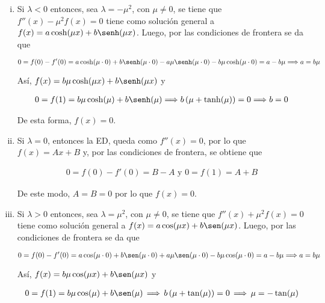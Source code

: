 \documentclass[fleqn]{article}
\begin{document}
\begin{enumerate}[I.]
\begin{enumerate}
			\normalfont

			\begin{enumerate}[i)]
				\item Si $ \lambda < 0 $ entonces, sea $ \lambda = - \mu^2 $, con $ \mu \neq 0 $, se tiene que $ f''(x) - \mu^2 f(x) = 0 $
				tiene como solución general a $ f(x) = a \cosh(\mu x) + b \senh(\mu x) $. Luego, por las condiciones de frontera se da que
				
				\begin{equation*}
					0 = f(0) - f'(0) = a \cosh(\mu \cdot 0) + b \senh(\mu \cdot 0) - a \mu \senh(\mu \cdot 0) - b \mu \cosh(\mu \cdot 0) = a - b \mu \Longrightarrow a = b \mu
				\end{equation*}

				Así, $ f(x) = b \mu \cosh(\mu x) + b \senh(\mu x) $ y 

				\begin{align*}
					0 = f(1) = b \mu \cosh(\mu) + b \senh(\mu) \Longrightarrow b \left( \mu + \tanh(\mu) \right) = 0 \Longrightarrow b = 0
				\end{align*}
				
				De esta forma, $ f(x) = 0 $.

				\item Si $ \lambda = 0 $, entonces la ED, queda como $ f''(x) = 0 $, por lo que $ f(x) = Ax + B $ y, por las condiciones de frontera, se obtiene que 
				
				\begin{align*}
					0 = f(0) - f'(0) = B - A \mbox{ y } 0 = f(1) = A + B
				\end{align*}

				De este modo, $ A = B = 0 $ por lo que $ f(x) = 0 $.
				
				\item Si $ \lambda > 0 $ entonces, sea $ \lambda = \mu^2 $, con $ \mu \neq 0 $, se tiene que $ f''(x) + \mu^2 f(x) = 0 $
				tiene como solución general a $ f(x) = a \cos(\mu x) + b \sen(\mu x) $. Luego, por las condiciones de frontera se da que
				
				\begin{equation*}
					0 = f(0) - f'(0) = a \cos(\mu \cdot 0) + b \sen(\mu \cdot 0) + a \mu \sen (\mu \cdot 0) - b \mu \cos (\mu \cdot 0) = a - b \mu \Longrightarrow a = b \mu
				\end{equation*}

				Así, $ f(x) = b \mu \cos(\mu x) + b \sen(\mu x) $ y 

				\begin{align*}
					0 = f(1) = b \mu \cos(\mu) + b \sen(\mu) \, \Longrightarrow \, b \left( \mu + \tan(\mu) \right) = 0 \, \Longrightarrow \, \mu = - \tan (\mu)
				\end{align*}
				

\end{enumerate}
\end{enumerate}
\end{enumerate}
\end{document}
